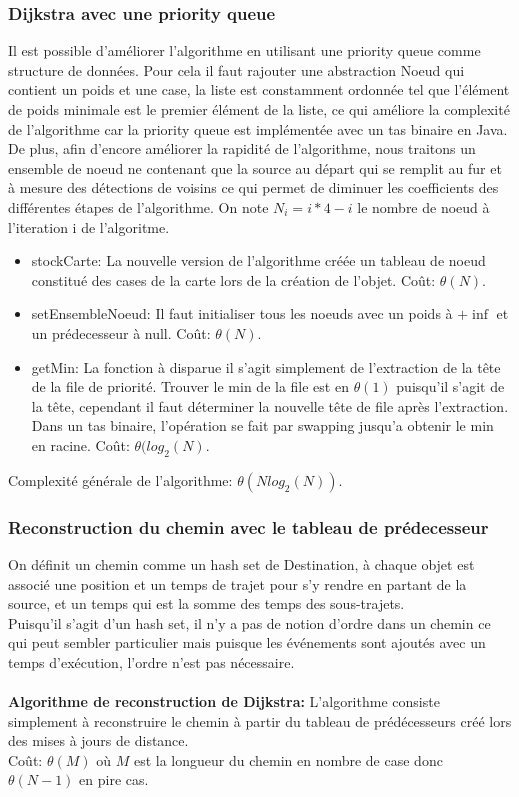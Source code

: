\documentclass[12pt,a4paper]{article}
\begin{document}
\subsubsection{Dijkstra avec une priority queue}
Il est possible d'améliorer l'algorithme en utilisant une priority queue comme structure de données. Pour cela il faut rajouter une abstraction Noeud qui contient un poids et une case, la liste est constamment ordonnée tel que l'élément de poids minimale est le premier élément de la liste, ce qui améliore la complexité de l'algorithme car la priority queue est implémentée avec un tas binaire en Java.\\
De plus, afin d'encore améliorer la rapidité de l'algorithme, nous traitons un ensemble de noeud ne contenant que la source au départ qui se remplit au fur et à mesure des détections de voisins ce qui permet de diminuer les coefficients des différentes étapes de l'algorithme. On note $N_i=i*4-i$ le nombre de noeud à l'iteration i de l'algoritme.
\begin{itemize}
	\item stockCarte: La nouvelle version de l'algorithme créée un tableau de noeud constitué des cases de la carte lors de la création de l'objet. Coût: $\theta(N)$.
	\item setEnsembleNoeud: Il faut initialiser tous les noeuds avec un poids à $+\inf$ et un prédecesseur à null. Coût: $\theta(N)$.
	\item getMin: La fonction à disparue il s'agit simplement de l'extraction de la tête de la file de priorité. Trouver le min de la file est en $\theta(1)$ puisqu'il s'agit de la tête, cependant il faut déterminer la nouvelle tête de file après l'extraction. Dans un tas binaire, l'opération se fait par swapping jusqu'a obtenir le min en racine. Coût: $\theta(log_2(N)$.
\end{itemize}
Complexité générale de l'algorithme: $\theta(Nlog_2(N))$.\\

\subsubsection{Reconstruction du chemin avec le tableau de prédecesseur}

On définit un chemin comme un hash set de Destination, à chaque objet est associé une position et un temps de trajet pour s'y rendre en partant de la source, et un temps qui est la somme des temps des sous-trajets.\\
Puisqu'il s'agit d'un hash set, il n'y a pas de notion d'ordre dans un chemin ce qui peut sembler particulier mais puisque les événements sont ajoutés avec un temps d'exécution, l'ordre n'est pas nécessaire.\\\\
\textbf{Algorithme de reconstruction de Dijkstra:} L'algorithme consiste simplement à reconstruire le chemin à partir du tableau de prédécesseurs créé lors des mises à jours de distance.\\
Coût: $\theta(M)$ où $M$ est la longueur du chemin en nombre de case donc $\theta(N-1)$ en pire cas.
\end{document}

